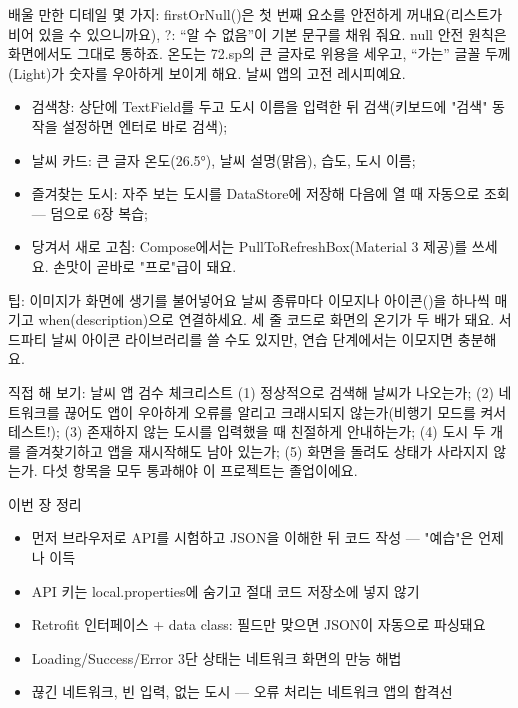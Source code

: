 배울 만한 디테일 몇 가지: firstOrNull()은 첫 번째 요소를 안전하게 꺼내요(리스트가 비어 있을 수 있으니까요), ?: “알 수 없음”이 기본 문구를 채워 줘요. null 안전 원칙은 화면에서도 그대로 통하죠. 온도는 72.sp의 큰 글자로 위용을 세우고, “가는” 글꼴 두께(Light)가 숫자를 우아하게 보이게 해요. 날씨 앱의 고전 레시피예요.



\begin{itemize}
  \item 검색창: 상단에 TextField를 두고 도시 이름을 입력한 뒤 검색(키보드에 "검색" 동작을 설정하면 엔터로 바로 검색);
  \item 날씨 카드: 큰 글자 온도(26.5°), 날씨 설명(맑음), 습도, 도시 이름;
  \item 즐겨찾는 도시: 자주 보는 도시를 DataStore에 저장해 다음에 열 때 자동으로 조회 — 덤으로 6장 복습;
  \item 당겨서 새로 고침: Compose에서는 PullToRefreshBox(Material 3 제공)를 쓰세요. 손맛이 곧바로 "프로"급이 돼요.
\end{itemize}

\begin{tcbinfo}{팁: 이미지가 화면에 생기를 불어넣어요}
날씨 종류마다 이모지나 아이콘()을 하나씩 매기고 when(description)으로 연결하세요. 세 줄 코드로 화면의 온기가 두 배가 돼요. 서드파티 날씨 아이콘 라이브러리를 쓸 수도 있지만, 연습 단계에서는 이모지면 충분해요.

\end{tcbinfo}

\begin{tcbpractice}{직접 해 보기: 날씨 앱 검수 체크리스트}
(1) 정상적으로 검색해 날씨가 나오는가; (2) 네트워크를 끊어도 앱이 우아하게 오류를 알리고 크래시되지 않는가(비행기 모드를 켜서 테스트!); (3) 존재하지 않는 도시를 입력했을 때 친절하게 안내하는가; (4) 도시 두 개를 즐겨찾기하고 앱을 재시작해도 남아 있는가; (5) 화면을 돌려도 상태가 사라지지 않는가. 다섯 항목을 모두 통과해야 이 프로젝트는 졸업이에요.

\end{tcbpractice}

\begin{tcbsummary}{이번 장 정리}
\begin{itemize}
  \item 먼저 브라우저로 API를 시험하고 JSON을 이해한 뒤 코드 작성 — "예습"은 언제나 이득
  \item API 키는 local.properties에 숨기고 절대 코드 저장소에 넣지 않기
  \item Retrofit 인터페이스 + data class: 필드만 맞으면 JSON이 자동으로 파싱돼요
  \item Loading/Success/Error 3단 상태는 네트워크 화면의 만능 해법
  \item 끊긴 네트워크, 빈 입력, 없는 도시 — 오류 처리는 네트워크 앱의 합격선
\end{itemize}

\end{tcbsummary}
